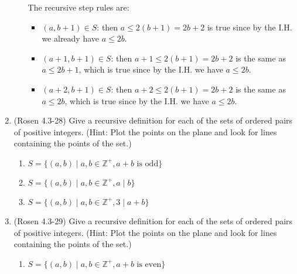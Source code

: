 \begin{enumerate}
\begin{enumerate}
{The recursive step rules are:
\begin{itemize}
\item $(a, b+1) \in S$: then $a \leq 2(b+1) = 2b + 2$ is true
since by the I.H. we already have $a\leq 2b$.
\item $(a+1,b+1) \in S$: then  $a + 1 \leq 2(b+1) = 2b + 2$ is the same
as $a \leq 2b + 1$, which is true since by the I.H. we have $a\leq 2b$.
\item $(a+2,b+1) \in S$: then  $a + 2 \leq 2(b+1) = 2b + 2$ is the same
as $a \leq 2b$, which is true since by the I.H. we have $a\leq 2b$.
\end{itemize}

}
\end{enumerate}

\item (Rosen 4.3-28) Give a recursive definition for each of the 
sets of ordered pairs of positive integers. 
(Hint: Plot the points on the plane and look for lines containing 
the points of the set.)

\begin{enumerate}
\item \streasy $S=\{(a,b)  \mid  a,b\in \mathbb{Z}^+, a+b \text{~is odd}\}$

\item \strmedium $S=\{(a,b)  \mid  a,b\in \mathbb{Z}^+, a  \mid  b\}$

\item \strmedium $S=\{(a,b)  \mid  a,b\in \mathbb{Z}^+, 3  \mid  a+b\}$
\end{enumerate}

\item (Rosen 4.3-29) Give a recursive definition for each of the 
sets of ordered pairs of positive integers. 
(Hint: Plot the points on the plane and look for lines containing 
the points of the set.)

\begin{enumerate}
\item \strmedium $S=\{(a,b)  \mid  a,b\in \mathbb{Z}^+, a+b \text{~is even}\}$


\end{enumerate}
\end{enumerate}

